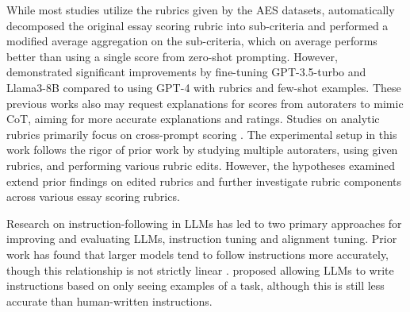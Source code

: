 While most studies utilize the rubrics given by the AES datasets, \citet{lee-etal-2024-unleashing} automatically decomposed the original essay scoring rubric into sub-criteria and performed a modified average aggregation on the sub-criteria, which on average performs better than using a single score from zero-shot prompting. However, \citet{10.1145/3706468.3706507} demonstrated significant improvements by fine-tuning GPT-3.5-turbo and Llama3-8B compared to using GPT-4 with rubrics and few-shot examples. These previous works also may request explanations for scores from autoraters to mimic CoT, aiming for more accurate explanations and ratings. 
Studies on analytic rubrics primarily focus on cross-prompt scoring \citep{chen-li-2023-pmaes}. The experimental setup in this work follows the rigor of prior work by 
studying multiple autoraters, using given rubrics, and performing various rubric edits. However, the hypotheses examined extend prior findings on edited rubrics and further investigate rubric components across various essay scoring rubrics.

Research on instruction-following in LLMs has led to two primary approaches for improving and evaluating LLMs, instruction tuning and alignment tuning. Prior work has found that larger models tend to follow instructions more accurately, though this relationship is not strictly linear \citep{ouyang2022training}. \citet{honovich-etal-2023-instruction} proposed allowing LLMs to write instructions based on only seeing examples of a task, although this is still less accurate than human-written instructions. 



